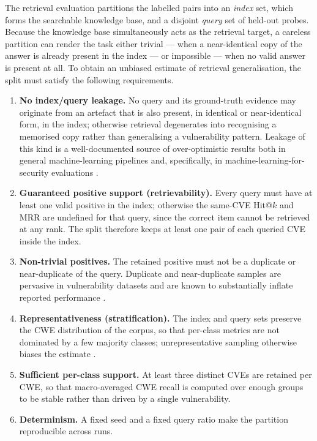 \documentclass[11pt, a4paper]{article}
\begin{document}
The retrieval evaluation partitions the labelled pairs into an \emph{index} set,
which forms the searchable knowledge base, and a disjoint \emph{query} set of
held-out probes. Because the knowledge base simultaneously acts as the retrieval
target, a careless partition can render the task either trivial --- when a
near-identical copy of the answer is already present in the index --- or
impossible --- when no valid answer is present at all. To obtain an unbiased
estimate of retrieval generalisation, the split must satisfy the following
requirements.

\begin{enumerate}[leftmargin=*, label=R\arabic*.]
  \item \textbf{No index/query leakage.} No query and its ground-truth evidence
    may originate from an artefact that is also present, in identical or
    near-identical form, in the index; otherwise retrieval degenerates into
    recognising a memorised copy rather than generalising a vulnerability
    pattern. Leakage of this kind is a well-documented source of over-optimistic
    results both in general machine-learning pipelines \cite{kaufman2012leakage}
    and, specifically, in machine-learning-for-security evaluations
    \cite{arp2022dosdonts}.

  \item \textbf{Guaranteed positive support (retrievability).} Every query must
    have at least one valid positive in the index; otherwise the same-CVE
    Hit@$k$ and MRR are undefined for that query, since the correct item cannot
    be retrieved at any rank. The split therefore keeps at least one pair of each
    queried CVE inside the index.

  \item \textbf{Non-trivial positives.} The retained positive must not be a
    duplicate or near-duplicate of the query. Duplicate and near-duplicate
    samples are pervasive in vulnerability datasets and are known to
    substantially inflate reported performance
    \cite{chakraborty2020reveal, croft2023dataquality}.

  \item \textbf{Representativeness (stratification).} The index and query sets
    preserve the CWE distribution of the corpus, so that per-class metrics are
    not dominated by a few majority classes; unrepresentative sampling otherwise
    biases the estimate \cite{arp2022dosdonts}.

  \item \textbf{Sufficient per-class support.} At least three distinct CVEs are
    retained per CWE, so that macro-averaged CWE recall is computed over enough
    groups to be stable rather than driven by a single vulnerability.

  \item \textbf{Determinism.} A fixed seed and a fixed query ratio make the
    partition reproducible across runs.
\end{enumerate}
\end{document}
